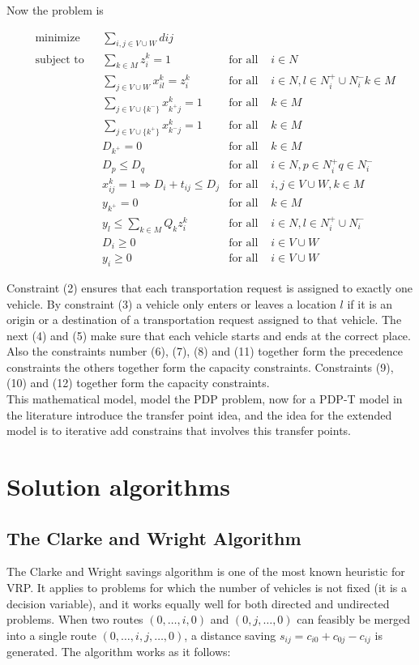 \documentclass[10pt,twoside]{article}
\begin{document}
\vspace{1cm}
Now the problem is 

\begin{align}
& {\text{minimize}}
& & \sum_{i,j\in V \cup W} dij && \\
& \text{subject to}
& & \sum_{k\in M} z_i^k = 1 & \text{for all }& i\in N \\
&&& \sum_{j\in V\cup W} x_{il}^k = z_{i}^k & \text{for all }& i \in N,l\in N^+_i\cup N_i^- k\in M\\
&&& \sum_{j\in V\cup\{k^-\}} x^k_{k^+ j} = 1 & \text{for all }& k\in M\\
&&& \sum_{j\in V\cup\{k^+\}} x^k_{k^- j} = 1 & \text{for all }& k\in M\\
&&& D_{k^+} = 0 & \text{for all }& k\in M\\
&&& D_p \leq D_q & \text{for all }& i\in N, p\in N_i^+ q\in N_i^-\\
&&& x_{ij}^k = 1\Rightarrow D_i + t_{ij} \leq D_j & \text{for all }& i,j \in V\cup W, k\in M\\
&&& y_{k^+} = 0 & \text{for all }& k\in M\\
&&& y_l \leq \sum_{k\in M} Q_kz_i^k & \text{for all }& i\in N, l\in N_i^+\cup N_i^-\\
&&& D_i \geq 0 & \text{for all }& i\in V\cup W\\
&&& y_i \geq 0 & \text{for all }& i\in V\cup W
\end{align}

Constraint (2) ensures that each transportation request is assigned to exactly one vehicle. By constraint (3) a vehicle only enters or leaves a location $l$ if it is an origin or a destination of a transportation request assigned to that vehicle. The next (4) and (5) make sure that each vehicle starts and ends at the correct place. Also the constraints number (6), (7), (8) and (11) together form the precedence constraints the others together form the capacity constraints.  Constraints (9), (10) and (12) together form the capacity constraints.\\
This mathematical model, model the PDP problem, now for a PDP-T model in the literature introduce the transfer point idea, and the idea for the extended model is to iterative add constrains that involves this transfer points. 


\section{Solution algorithms}\label{sec_alg}
\subsection{The Clarke and Wright Algorithm}
The Clarke and Wright savings algorithm is one of the most known heuristic for VRP. It applies to problems for which the number of vehicles is not fixed (it is a decision variable), and it works equally well for both directed and undirected problems. When two routes ${(0,…,i,0)}$ and ${(0,j,…,0)}$ can feasibly be merged into a single route ${(0,…,i,j,…,0)}$, a distance saving ${s_{ij}=c_{i0}+c_{0j}-c_{ij}}$ is generated. The algorithm works as it follows: \\
\end{document}
